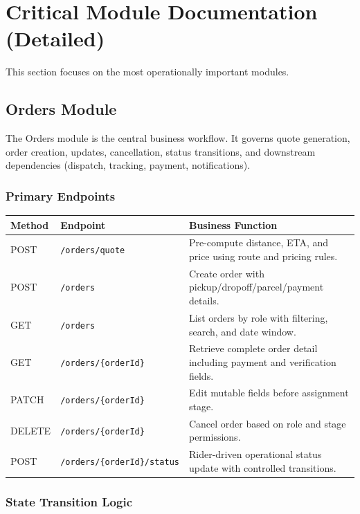 \section{Critical Module Documentation (Detailed)}

This section focuses on the most operationally important modules.

\subsection{Orders Module}

The Orders module is the central business workflow. It governs quote generation,
order creation, updates, cancellation, status transitions, and downstream
dependencies (dispatch, tracking, payment, notifications).

\subsubsection{Primary Endpoints}

\begin{tabularx}{\textwidth}{@{}p{2.2cm}p{4.4cm}X@{}}
\toprule
\textbf{Method} & \textbf{Endpoint} & \textbf{Business Function} \\
\midrule
POST & \texttt{/orders/quote} & Pre-compute distance, ETA, and price using route and pricing rules. \\
POST & \texttt{/orders} & Create order with pickup/dropoff/parcel/payment details. \\
GET & \texttt{/orders} & List orders by role with filtering, search, and date window. \\
GET & \texttt{/orders/\{orderId\}} & Retrieve complete order detail including payment and verification fields. \\
PATCH & \texttt{/orders/\{orderId\}} & Edit mutable fields before assignment stage. \\
DELETE & \texttt{/orders/\{orderId\}} & Cancel order based on role and stage permissions. \\
POST & \texttt{/orders/\{orderId\}/status} & Rider-driven operational status update with controlled transitions. \\
\bottomrule
\end{tabularx}

\subsubsection{State Transition Logic}

